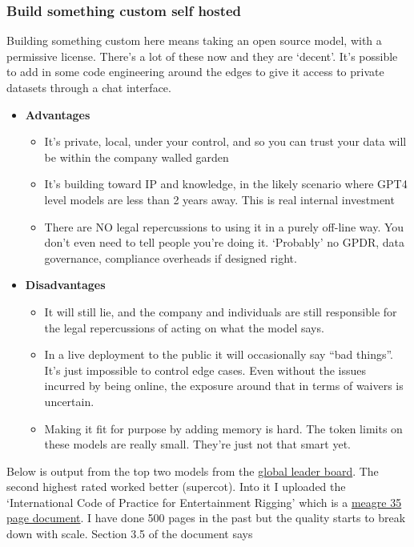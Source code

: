 \subsubsection{Build something custom self hosted}
Building something custom here means taking an open source model, with a permissive license. There's a lot of these now and they are `decent'. It's possible to add in some code engineering around the edges to give it access to private datasets through a chat interface.
\begin{itemize}
\item \textbf{Advantages}
\begin{itemize}
\item It's private, local, under your control, and so you can trust your data will be within the company walled garden
\item It's building toward IP and knowledge, in the likely scenario where GPT4 level models are less than 2 years away. This is real internal investment
\item There are NO legal repercussions to using it in a purely off-line way. You don't even need to tell people you're doing it. `Probably' no GPDR, data governance, compliance overheads if designed right.
\end{itemize}
\item \textbf{Disadvantages}
\begin{itemize}
\item It will still lie, and the company and individuals are still responsible for the legal repercussions of acting on what the model says.
\item In a live deployment to the public it will occasionally say ``bad things''. It's just impossible to control edge cases. Even without the issues incurred by being online, the exposure around that in terms of waivers is uncertain.
\item Making it fit for purpose by adding memory is hard. The token limits on these models are really small. They're just not that smart yet.
\end{itemize}
\end{itemize}
Below is output from the top two models from the \href{https://huggingface.co/spaces/HuggingFaceH4/open_llm_leaderboard}{global leader board}. The second highest rated worked better (supercot). Into it I uploaded the `International Code of Practice for Entertainment Rigging' which is a \href{https://www.plasa.org/wp-content/uploads/2017/11/ICOPER_V1.0.pdf}{meagre 35 page document}. I have done 500 pages in the past but the quality starts to break down with scale. Section 3.5 of the document says
